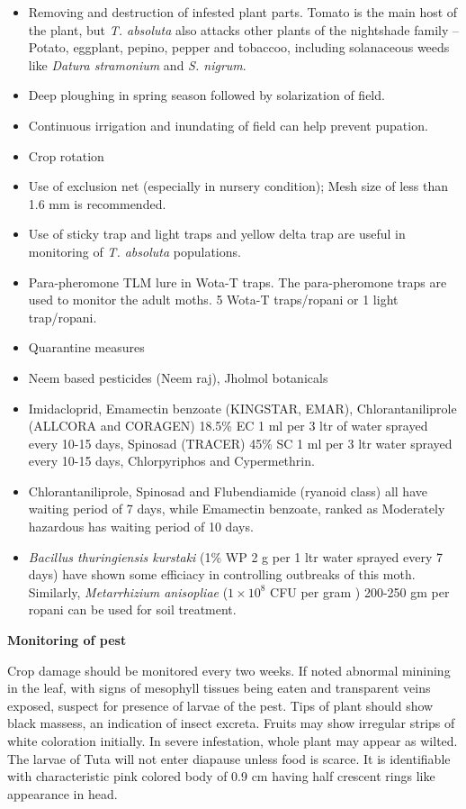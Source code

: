 \documentclass[
]{book}
\providecommand{\tightlist}{%
  \setlength{\itemsep}{0pt}\setlength{\parskip}{0pt}}
\begin{document}
\begin{itemize}
\tightlist
\item
  Removing and destruction of infested plant parts. Tomato is the main host of the plant, but \emph{T. absoluta} also attacks other plants of the nightshade family -- Potato, eggplant, pepino, pepper and tobaccoo, including solanaceous weeds like \emph{Datura stramonium} and \emph{S. nigrum}.
\item
  Deep ploughing in spring season followed by solarization of field.
\item
  Continuous irrigation and inundating of field can help prevent pupation.
\item
  Crop rotation
\item
  Use of exclusion net (especially in nursery condition); Mesh size of less than 1.6 mm is recommended.
\item
  Use of sticky trap and light traps and yellow delta trap are useful in monitoring of \emph{T. absoluta} populations.
\item
  Para-pheromone TLM lure in Wota-T traps. The para-pheromone traps are used to monitor the adult moths. 5 Wota-T traps/ropani or 1 light trap/ropani.
\item
  Quarantine measures
\item
  Neem based pesticides (Neem raj), Jholmol botanicals
\item
  Imidacloprid, Emamectin benzoate (KINGSTAR, EMAR), Chlorantaniliprole (ALLCORA and CORAGEN) 18.5\% EC 1 ml per 3 ltr of water sprayed every 10-15 days, Spinosad (TRACER) 45\% SC 1 ml per 3 ltr water sprayed every 10-15 days, Chlorpyriphos and Cypermethrin.
\item
  Chlorantaniliprole, Spinosad and Flubendiamide (ryanoid class) all have waiting period of 7 days, while Emamectin benzoate, ranked as Moderately hazardous has waiting period of 10 days.
\item
  \emph{Bacillus thuringiensis kurstaki} (1\% WP 2 g per 1 ltr water sprayed every 7 days) have shown some efficiacy in controlling outbreaks of this moth. Similarly, \emph{Metarrhizium anisopliae} (\(1 \times 10^8\) CFU per gram ) 200-250 gm per ropani can be used for soil treatment.
\end{itemize}

\textbf{Monitoring of pest}

Crop damage should be monitored every two weeks. If noted abnormal minining in the leaf, with signs of mesophyll tissues being eaten and transparent veins exposed, suspect for presence of larvae of the pest. Tips of plant should show black massess, an indication of insect excreta. Fruits may show irregular strips of white coloration initially. In severe infestation, whole plant may appear as wilted. The larvae of Tuta will not enter diapause unless food is scarce. It is identifiable with characteristic pink colored body of 0.9 cm having half crescent rings like appearance in head.
\end{document}
